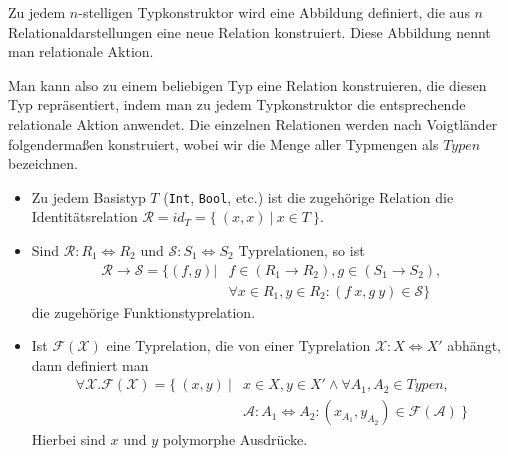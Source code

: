 \begin{mydef}
Zu jedem $n$-stelligen Typkonstruktor wird eine Abbildung definiert, die aus $n$ Relationaldarstellungen eine neue Relation konstruiert.
Diese Abbildung nennt man relationale Aktion.
\end{mydef}




Man kann also zu einem beliebigen Typ eine Relation konstruieren, die diesen Typ repräsentiert, indem man zu jedem Typkonstruktor
die entsprechende relationale Aktion anwendet. Die einzelnen Relationen werden nach Voigtländer \cite{voigtlander} folgendermaßen konstruiert, wobei wir die Menge aller Typmengen als $Typen$ bezeichnen.

\begin{itemize}
\item Zu jedem Basistyp $T$ (\texttt{Int}, \texttt{Bool}, etc.) ist die zugehörige Relation die Identitätsrelation $\mathcal{R} = id_{T} = \{~(x, x)~|~x \in T~\}$.
\item Sind $\mathcal{R} : R_1 \Leftrightarrow R_2$ und $\mathcal{S} : S_1 \Leftrightarrow S_2$ Typrelationen, so ist
\begin{align*}
\mathcal{R} \rightarrow \mathcal{S} = \{ (f, g) | & f \in (R_1 \rightarrow R_2), g \in (S_1 \rightarrow S_2),\\
& \forall x \in R_1, y \in R_2: (f\ x, g\ y) \in \mathcal{S} \}
\end{align*}
die zugehörige Funktionstyprelation.
\item Ist $\mathcal{F}(\mathcal{X})$ eine Typrelation, die von einer Typrelation $\mathcal{X} : X \Leftrightarrow X'$ abhängt,
dann definiert man
\begin{align*}
\forall \mathcal{X} . \mathcal{F}(\mathcal{X}) = \{~(x, y)~|& x \in X, y \in X' \wedge \forall A_1, A_2 \in Typen,\\
&\mathcal{A} : A_1 \Leftrightarrow A_2: (x_{A_1}, y_{A_2}) \in \mathcal{F}(\mathcal{A})~\}
\end{align*}
Hierbei sind $x$ und $y$ polymorphe Ausdrücke.
\end{itemize}

